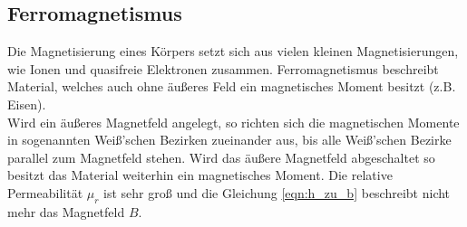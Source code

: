\subsection{Ferromagnetismus}
Die Magnetisierung eines Körpers setzt sich aus vielen kleinen Magnetisierungen, wie Ionen und quasifreie Elektronen zusammen.
Ferromagnetismus beschreibt Material, welches auch ohne äußeres Feld ein magnetisches Moment besitzt (z.B. Eisen).\\
Wird ein äußeres Magnetfeld angelegt, so richten sich die magnetischen Momente in sogenannten Weiß'schen Bezirken zueinander aus,
bis alle Weiß'schen Bezirke parallel zum Magnetfeld stehen. Wird das äußere Magnetfeld abgeschaltet so besitzt das Material weiterhin
ein magnetisches Moment. Die relative Permeabilität $\mu_r$ ist sehr groß und die Gleichung \eqref{eqn:h_zu_b} beschreibt nicht mehr
das Magnetfeld $B$.\\

